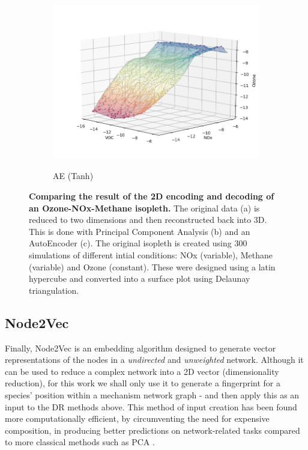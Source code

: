 \begin{figure}[H]
\begin{subfigure}{.33\textwidth}
  \includegraphics[width=\textwidth]{4fig/rae.png}
  \label{fig:iae}
  \caption{AE (Tanh)}
\end{subfigure}%
\caption{
\textbf{Comparing the result of the 2D encoding and decoding of an Ozone-NOx-Methane isopleth.} The original data (a) is reduced to two dimensions and then reconstructed back into 3D. This is done with Principal Component Analysis (b) and an AutoEncoder (c). The original isopleth is created using  300 simulations of different
 intial conditions: NOx (variable), Methane (variable) and Ozone (constant). These were designed using a latin hypercube and converted into a surface plot using Delaunay triangulation. }
\label{fig:aeiso}
\end{figure}

\subsection{Node2Vec}\label{sec:n2v}
Finally, Node2Vec is an embedding algorithm designed to generate vector representations of the nodes in a \textit{undirected} and \textit{unweighted} network. Although it can be used to reduce a complex network into a 2D vector (dimensionality reduction), for this work we shall only use it to generate a fingerprint for a species' position within a mechanism network graph - and then apply this as an input to the DR methods above. This method of input creation has been found more computationally efficient, by circumventing the need for expensive composition, in producing better predictions on network-related tasks compared to more classical methods such as PCA \citep{node2vec}.


